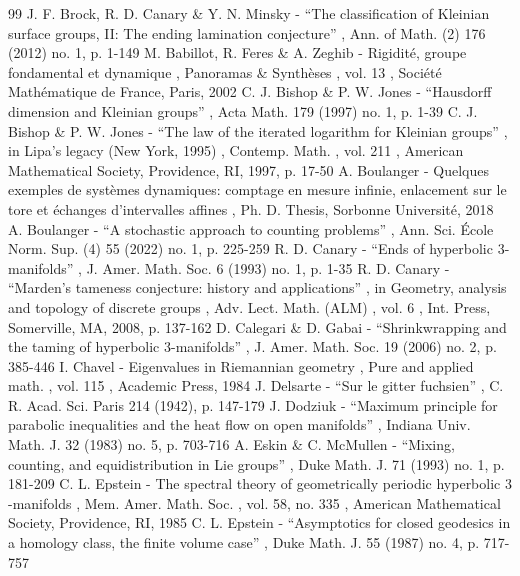 \documentclass[10pt]{amsart}
\theoremstyle{plain}
\theoremstyle{definition}
\begin{document}
\begin{thebibliography}{99}
 J. F. Brock, R. D. Canary \& Y. N. Minsky - “The classification of Kleinian surface groups, II: The ending lamination conjecture” , Ann. of Math. (2) 176 (2012) no. 1, p. 1-149
 M. Babillot, R. Feres \& A. Zeghib - Rigidité, groupe fondamental et dynamique , Panoramas \& Synthèses , vol. 13 , Société Mathématique de France, Paris, 2002
 C. J. Bishop \& P. W. Jones - “Hausdorff dimension and Kleinian groups” , Acta Math. 179 (1997) no. 1, p. 1-39
 C. J. Bishop \& P. W. Jones - “The law of the iterated logarithm for Kleinian groups” , in Lipa’s legacy (New York, 1995) , Contemp. Math. , vol. 211 , American Mathematical Society, Providence, RI, 1997, p. 17-50
 A. Boulanger - Quelques exemples de systèmes dynamiques: comptage en mesure infinie, enlacement sur le tore et échanges d’intervalles affines , Ph. D. Thesis, Sorbonne Université, 2018
 A. Boulanger - “A stochastic approach to counting problems” , Ann. Sci. École Norm. Sup. (4) 55 (2022) no. 1, p. 225-259
 R. D. Canary - “Ends of hyperbolic $3$-manifolds” , J. Amer. Math. Soc. 6 (1993) no. 1, p. 1-35
 R. D. Canary - “Marden’s tameness conjecture: history and applications” , in Geometry, analysis and topology of discrete groups , Adv. Lect. Math. (ALM) , vol. 6 , Int. Press, Somerville, MA, 2008, p. 137-162
 D. Calegari \& D. Gabai - “Shrinkwrapping and the taming of hyperbolic 3-manifolds” , J. Amer. Math. Soc. 19 (2006) no. 2, p. 385-446
 I. Chavel - Eigenvalues in Riemannian geometry , Pure and applied math. , vol. 115 , Academic Press, 1984
 J. Delsarte - “Sur le gitter fuchsien” , C. R. Acad. Sci. Paris 214 (1942), p. 147-179
 J. Dodziuk - “Maximum principle for parabolic inequalities and the heat flow on open manifolds” , Indiana Univ. Math. J. 32 (1983) no. 5, p. 703-716
 A. Eskin \& C. McMullen - “Mixing, counting, and equidistribution in Lie groups” , Duke Math. J. 71 (1993) no. 1, p. 181-209
 C. L. Epstein - The spectral theory of geometrically periodic hyperbolic $3$-manifolds , Mem. Amer. Math. Soc. , vol. 58, no. 335 , American Mathematical Society, Providence, RI, 1985
 C. L. Epstein - “Asymptotics for closed geodesics in a homology class, the finite volume case” , Duke Math. J. 55 (1987) no. 4, p. 717-757

\end{thebibliography}
\end{document}

